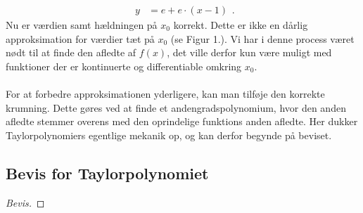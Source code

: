 \documentclass[12pt, a4paper]{article}
\begin{document}
\begin{refsection}
\[\begin{aligned}
    y&=e+e\cdot (x-1)
\end{aligned}
.\] 
Nu er værdien samt hældningen på $x_0$ korrekt. Dette er ikke en dårlig approksimation for værdier tæt på $x_0$ (se Figur 1.). Vi har i denne process været nødt til at finde den afledte af $f(x)$, det ville derfor kun være muligt med funktioner der er kontinuerte og differentiable omkring $x_0$. \\
\\
For at forbedre approksimationen yderligere, kan man tilføje den korrekte krumning. Dette gøres ved at finde et andengradspolynomium, hvor den anden afledte stemmer overens med den oprindelige funktions anden afledte. Her dukker Taylorpolynomiers egentlige mekanik op, og kan derfor begynde på beviset.\\

\subsection{Bevis for Taylorpolynomiet}
\begin{proof}[Bevis]
    

\end{proof}
\end{refsection}
\end{document}
